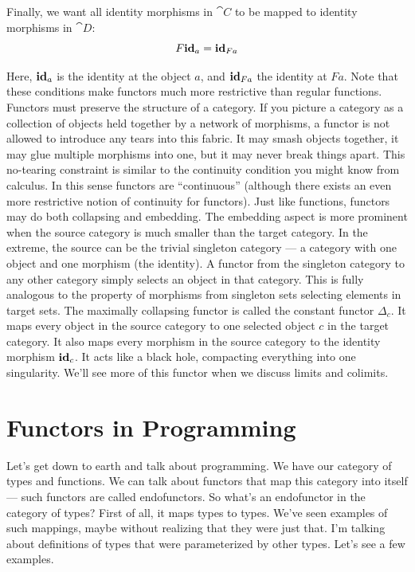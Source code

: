 \noindent
Finally, we want all identity morphisms in $\cat{C}$ to be mapped to identity morphisms in
$\cat{D}$:
\[F \idarrow[a] = \idarrow[F a]\]

\noindent
Here, $\idarrow[a]$ is the identity at the object $a$,
and $\idarrow[F a]$ the identity at $F a$.
Note that these conditions make functors much more restrictive than regular functions.
Functors must preserve the structure of a category. If you picture a
category as a collection of objects held together by a network of
morphisms, a functor is not allowed to introduce any tears into this
fabric. It may smash objects together, it may glue multiple morphisms
into one, but it may never break things apart. This no-tearing
constraint is similar to the continuity condition you might know from
calculus. In this sense functors are ``continuous'' (although there
exists an even more restrictive notion of continuity for functors). Just
like functions, functors may do both collapsing and embedding. The
embedding aspect is more prominent when the source category is much
smaller than the target category. In the extreme, the source can be the
trivial singleton category --- a category with one object and one
morphism (the identity). A functor from the singleton category to any
other category simply selects an object in that category. This is fully
analogous to the property of morphisms from singleton sets selecting
elements in target sets. The maximally collapsing functor is called the
constant functor $\Delta_c$. It maps every object in the source
category to one selected object $c$ in the target category. It also
maps every morphism in the source category to the identity morphism
$\idarrow[c]$. It acts like a black hole, compacting
everything into one singularity. We'll see more of this functor when we
discuss limits and colimits.

\section{Functors in Programming}

Let's get down to earth and talk about programming. We have our category
of types and functions. We can talk about functors that map this
category into itself --- such functors are called endofunctors. So
what's an endofunctor in the category of types? First of all, it maps
types to types. We've seen examples of such mappings, maybe without
realizing that they were just that. I'm talking about definitions of
types that were parameterized by other types. Let's see a few examples.

